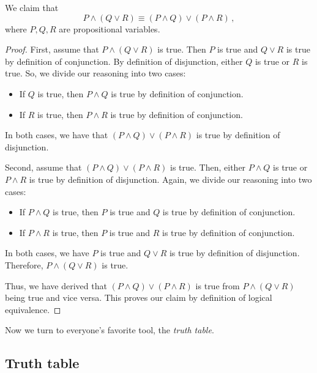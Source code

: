 \begin{example}
    \label{ex:equiv1}
   We claim that
   \begin{equation*}
       P \wedge (Q \vee R) \equiv (P \wedge Q) \vee (P \wedge R) \,,
   \end{equation*}
   where $P, Q, R$ are propositional variables.

   \begin{proof}
       First, assume that $P \wedge (Q \vee R)$ is true. 
       Then $P$ is true and $Q\vee R$ is true by definition of conjunction.
       By definition of disjunction, either $Q$ is true or $R$ is true. So, we divide
       our reasoning into two cases:
       \begin{itemize}
           \item If $Q$ is true, then $P \wedge Q$ is true by definition of conjunction.
           \item If $R$ is true, then $P \wedge R$ is true by definition of conjunction.
       \end{itemize}
       In both cases, we have that $(P \wedge Q) \vee (P \wedge R)$ is true by
       definition of disjunction.

       Second,
       assume that $(P \wedge Q) \vee (P \wedge R) $ is true.
       Then, either $P \wedge Q$ is true or $P \wedge R$ is true by definition of disjunction.
       Again, we divide our reasoning into two cases:
       \begin{itemize}
           \item If $P \wedge Q$ is true, then $P$ is true and $Q$ is true by definition of conjunction.
           \item If $P \wedge R$ is true, then $P$ is true and $R$ is true by definition of conjunction.
       \end{itemize}
       In both cases, we have $P$ is true and $Q \vee R$ is true by definition of disjunction.
       Therefore,
        $P \wedge (Q \vee R)$ is true.

        Thus, we have derived that $(P \wedge Q) \vee (P \wedge R)$ is true from 
        $P \wedge (Q \vee R)$ being true and vice versa.
        This proves our claim by definition of logical equivalence.
   \end{proof}
   
\end{example}

Now we turn to everyone's favorite tool, the \emph{truth table}.

\subsection{Truth table}


